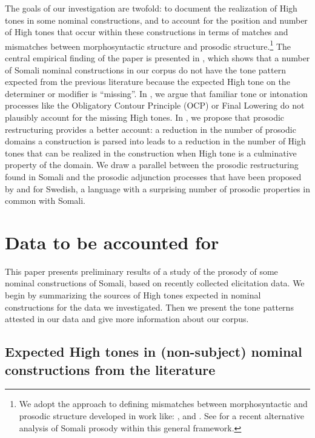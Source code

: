 \documentclass[output=paper]{langscibook}
\begin{document}
The goals of our investigation are twofold: to document the realization of High tones in some nominal constructions, and to account for the position and number of High tones that occur within these constructions in terms of matches and mismatches between morphosyntactic structure and prosodic structure.\footnote{We adopt the approach to defining mismatches between morphosyntactic and prosodic structure developed in work like: \citet{Downing1999,Downing2016,Inkelas1993,inkelas2014interplay,Ito2012,Ito2013,Nespor1986,Riad2012,Selkirk1986,selkirk2011syntax,Vigário2010}, and \citet{vogel2010phonology}. See \citet{Green2016} for a recent alternative analysis of Somali prosody within this general framework.} The central empirical finding of the paper is presented in , which shows that a number of Somali nominal constructions in our corpus do not have the tone pattern expected from the previous literature because the expected High tone on the determiner or modifier is ``missing''. In  , we argue that familiar tone or intonation processes like the Obligatory Contour Principle (OCP) or Final Lowering do not plausibly account for the missing High tones. In  , we propose that prosodic restructuring provides a better account: a reduction in the number of prosodic domains a construction is parsed into leads to a reduction in the number of High tones that can be realized in the construction when High tone is a culminative property of the domain. We draw a parallel between the prosodic restructuring found in Somali and the prosodic adjunction processes that have been proposed by \citet{Myrberg2015} and \citet{Riad2016} for Swedish, a language with a surprising number of prosodic properties in common with Somali.


\section{Data to be accounted for}
\label{sec:downing:2}

This paper presents preliminary results of a study of the prosody of some nominal constructions of Somali, based on recently collected elicitation data. We begin by summarizing the sources of High tones expected in nominal constructions for the data we investigated. Then we present the tone patterns attested in our data and give more information about our corpus.


\subsection{Expected High tones in (non-subject) nominal constructions from the literature}
\end{document}
